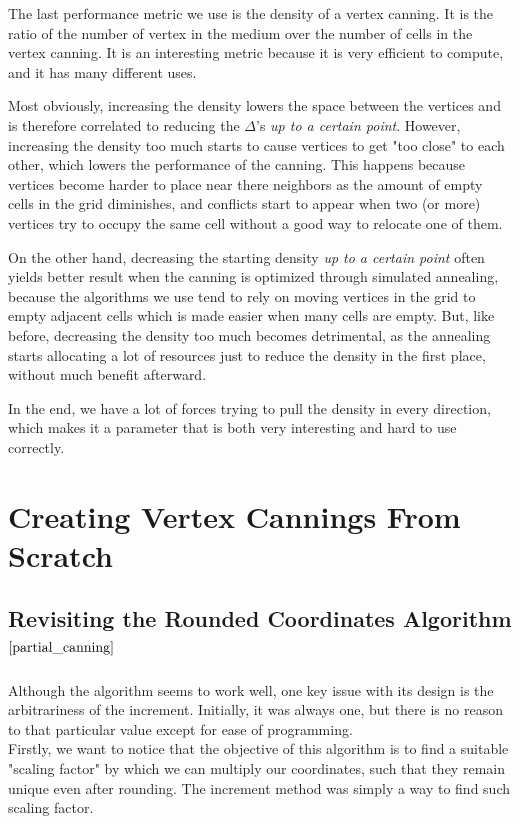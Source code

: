 \documentclass{report}
\begin{document}
The last performance metric we use is the density of a vertex canning. It is the ratio of the number of vertex in the medium over the number of cells in the vertex canning. It is an interesting metric because it is very efficient to compute, and it has many different uses.

Most obviously, increasing the density lowers the space between the vertices and is therefore correlated to reducing the $\Delta$'s \textit{up to a certain point}. However, increasing the density too much starts to cause vertices to get "too close" to each other, which lowers the performance of the canning. This happens because vertices become harder to place near there neighbors as the amount of empty cells in the grid diminishes, and conflicts start to appear when two (or more) vertices try to occupy the same cell without a good way to relocate one of them.

On the other hand, decreasing the starting density \textit{up to a certain point} often yields better result when the canning is optimized through simulated annealing, because the algorithms we use tend to rely on moving vertices in the grid to empty adjacent cells which is made easier when many cells are empty. But, like before, decreasing the density too much becomes detrimental, as the annealing starts allocating a lot of resources just to reduce the density in the first place, without much benefit afterward.

In the end, we have a lot of forces trying to pull the density in every direction, which makes it a parameter that is both very interesting and hard to use correctly.

\section{Creating Vertex Cannings From Scratch}

\subsection{Revisiting the Rounded Coordinates Algorithm$^{\ref{partial_canning}}$}

Although the algorithm seems to work well, one key issue with its design is the arbitrariness of the increment. Initially, it was always one, but there is no reason to that particular value except for ease of programming.\\

Firstly, we want to notice that the objective of this algorithm is to find a suitable "scaling factor" by which we can multiply our coordinates, such that they remain unique even after rounding. The increment method was simply a way to find such scaling factor.
\end{document}
